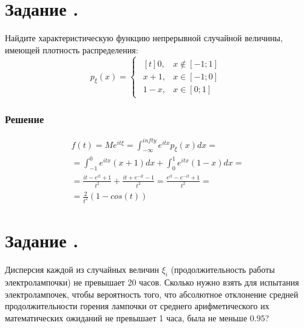 \documentclass[12pt]{article}
\begin{document}
\section*{Задание .}

Найдите характеристическую функцию непрерывной случайной величины, имеющей плотность распределения:
\begin{equation*}
	p_{\xi}(x) =
	\begin{cases}
		\begin{aligned}[t]
			0,     & x \notin [-1; 1] \\
			x + 1, & x \in [-1; 0]    \\
			1 - x, & x \in [0; 1]
		\end{aligned}
	\end{cases}
\end{equation*}
\subsubsection*{Решение}
\begin{gather*}
	f(t) = Me^{it\xi} = \int_{-\infty}^{infty}e^{itx}p_{\xi}(x)dx = \\
	= \int_{-1}^{0}e^{itx}(x + 1)dx + \int_{0}^{1}e^{itx}(1 - x)dx = \\
	= \frac{it - e^{it} + 1}{t^2} + \frac{it + e^{-it} - 1}{t^2} = \frac{e^{it} - e^{-it} + 1}{t^2} = \\
	= \frac{2}{t^2}\left(1 - cos(t)\right)
\end{gather*}

\section*{Задание .}

Дисперсия каждой из случайных величин $\xi_i$
(продолжительность работы электролампочки) не превышает 20 часов.
Сколько нужно взять для испытания электролампочек, чтобы вероятность того,
что абсолютное отклонение средней продолжительности горения лампочки
от среднего арифметического их математических ожиданий не превышает 1 часа,
была не меньше $0.95$?
\end{document}
